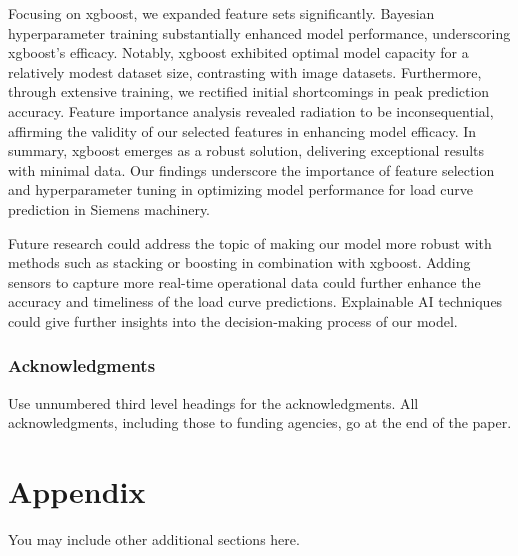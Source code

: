 \documentclass{article} %
\begin{document}
Focusing on \gls{xgboost}, we expanded feature sets significantly. Bayesian hyperparameter training substantially enhanced model performance, underscoring \gls{xgboost}'s efficacy. Notably, \gls{xgboost} exhibited optimal model capacity for a relatively modest dataset size, contrasting with image datasets. Furthermore, through extensive training, we rectified initial shortcomings in peak prediction accuracy. Feature importance analysis revealed radiation to be inconsequential, affirming the validity of our selected features in enhancing model efficacy. In summary, \gls{xgboost} emerges as a robust solution, delivering exceptional results with minimal data. Our findings underscore the importance of feature selection and hyperparameter tuning in optimizing model performance for load curve prediction in Siemens machinery. 

Future research could address the topic of making our model more robust with methods such as stacking or boosting in combination with \gls{xgboost}. Adding sensors to capture more real-time operational data could further enhance the accuracy and timeliness of the load curve predictions. Explainable AI techniques could give further insights into the decision-making process of our model.

\subsubsection*{Acknowledgments}
Use unnumbered third level headings for the acknowledgments. All
acknowledgments, including those to funding agencies, go at the end of the paper.





\appendix
\section{Appendix}
You may include other additional sections here.
\end{document}
